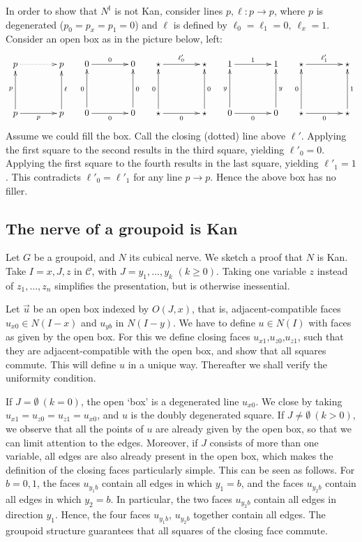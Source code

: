 \documentclass[10pt,a4paper]{article}
\newcommand{\CC}{{\mathcal C}}
\newcommand{\interval}{\mathbb{I}}
\begin{document}
In order to show that $N^\interval$ is not Kan, consider lines
$p,\ell: p\to p$, where $p$ is degenerated ($p_0=p_x=p_1=0$) and
$\ell$ is defined by $\ell_0=\ell_1=0,~\ell_x=1$.  Consider an open
box as in the picture below, left:
\[
\xymatrix@R=.6cm@C=.6cm{
p\ar@{.>}[rr]&      & p   &  0\ar[rr]^{0}&      & 0  &  \star\ar[rr]^{\ell'_0}&      & \star
&  1\ar[rr]^{1}&      & 1 &  \star\ar[rr]^{\ell'_1}&      & \star \\
                    &&    &        &&    &    &&       &        &&    &    &&       \\
p\ar[rr]_{p}\ar[uu]^{p}& & p\ar[uu]_{\ell} &
0\ar[rr]_{0}\ar[uu]^{0}& & 0\ar[uu]_{0}    &
\star\ar[rr]_{0}\ar[uu]^{0}& & \star\ar[uu]_{0}  &
0\ar[rr]_{0}\ar[uu]^{y}& & 0\ar[uu]_{y}    &
\star\ar[rr]_{0}\ar[uu]^{0}& & \star\ar[uu]_{1}     \\
}
\]
Assume we could fill the box.  Call the closing (dotted) line above
$\ell'$.  Applying the first square to the second results in the third
square, yielding $\ell'_0 = 0$.  Applying the first square to the
fourth results in the last square, yielding $\ell'_1 = 1$.  This
contradicts $\ell'_0 = \ell'_1$ for any line $p\to p$.  Hence the
above box has no filler.

\subsection{The nerve of a groupoid is Kan}\label{sec:groupoidnerve}
Let $G$ be a groupoid, and $N$ its cubical nerve.
We sketch a proof that $N$ is Kan. Take $I=x,J,z$ in $\CC$,
with $J=y_1,\ldots,y_k$ $(k\geq 0)$. Taking one variable $z$ instead of
$z_1,\ldots,z_n$ simplifies the presentation, but is otherwise inessential.

Let $\vec u$ be an open box indexed by $O(J,x)$, that is,
adjacent-compatible faces $u_{x0}\in N(I-x)$ and $u_{yb}$ in $N(I-y)$.
We have to define $u\in N(I)$ with faces as given by the open box.
For this we define closing faces $u_{x1}$,$u_{z0}$,$u_{z1}$, such that they
are adjacent-compatible with the open box, and show that all squares
commute. This will define $u$ in a unique way.
Thereafter we shall verify the uniformity condition.

If $J=\emptyset~(k=0)$,  the open `box' is a degenerated line $u_{x0}$.
We close by taking $u_{x1}=u_{z0}=u_{z1}=u_{x0}$, and $u$ is the
doubly degenerated square. If $J\neq\emptyset~(k>0)$,
we observe that all the points of $u$ are already given by the open
box, so that we can limit attention to the edges.
Moreover, if $J$ consists of more than one variable, all edges are also
already present in the open box, which makes the definition of the closing faces
particularly simple. This can be seen as follows.
For $b=0,1$, the faces $u_{y_1b}$ contain all edges in which $y_1 = b$,
and the faces $u_{y_2b}$ contain all edges in which $y_2 = b$.
In particular, the two faces $u_{y_2b}$ contain all edges in direction $y_1$.
Hence, the four faces $u_{y_1b}$, $u_{y_2b}$ together contain all edges.
The groupoid structure guarantees that all squares of the closing face commute.
\end{document}

